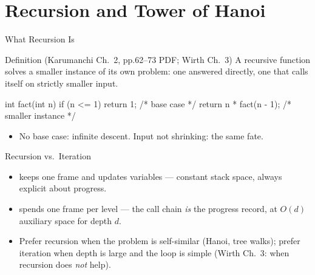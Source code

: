 \documentclass[aspectratio=169]{beamer}
\begin{document}

\section{Recursion and Tower of Hanoi}


\begin{frame}[fragile]{What Recursion Is}
  \begin{block}{Definition (Karumanchi Ch.~2, pp.62--73 PDF; Wirth Ch.~3)
    \cite{Karumanchi2017_data_structures_algorithms_made_easy,Wirth2004_algorithms_data_structures}}
    A recursive function solves a smaller instance of its own problem: one
     answered directly, one  that calls
    itself on strictly smaller input.
  \end{block}
\begin{semiverbatim}
int fact(int n) {
    if (n <= 1) return 1;        /* base case */
    return n * fact(n - 1);      /* smaller instance */
}
\end{semiverbatim}
  \begin{itemize}
    \item No base case: infinite descent. Input not shrinking: the same fate.
  \end{itemize}
\end{frame}

\begin{frame}{Recursion vs.\ Iteration}
  \begin{itemize}
    \item {} keeps one frame and updates variables --- constant
      stack space, always explicit about progress.
    \item {} spends one frame per level --- the call chain
      \emph{is} the progress record, at $O(d)$ auxiliary space for depth $d$.
    \item Prefer recursion when the problem is self-similar (Hanoi, tree
      walks); prefer iteration when depth is large and the loop is simple
      (Wirth Ch.~3: when recursion does \emph{not} help).
  \end{itemize}
\end{frame}
\end{document}

